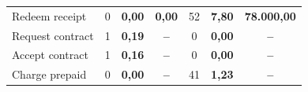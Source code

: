 \documentclass[conference]{IEEEtran}
\begin{document}
\begin{table}[!htbp]
\begin{tabular}{lcrccrc}
Redeem receipt                           & 0                                                                                        & \textbf{0,00}                                                                                                     & \multicolumn{1}{r}{\textbf{0,00}}                                                                  & 52                                                                                          & \textbf{7,80}                                                                                                     & \multicolumn{1}{r}{\textbf{78.000,00}}                                                            \\
Request contract                         & 1                                                                                        & \textbf{0,19}                                                                                                     & \textbf{--}                                                                                         & 0                                                                                           & \textbf{0,00}                                                                                                     & \textbf{--}                                                                                        \\
Accept contract                          & 1                                                                                        & \textbf{0,16}                                                                                                     & \textbf{--}                                                                                         & 0                                                                                           & \textbf{0,00}                                                                                                     & \textbf{--}                                                                                        \\
Charge prepaid                           & 0                                                                                        & \textbf{0,00}                                                                                                     & \textbf{--}                                                                                         & 41                                                                                          & \textbf{1,23}                                                                                                     & \textbf{--}                                                                                       
\end{tabular}
\end{table}
\end{document}
